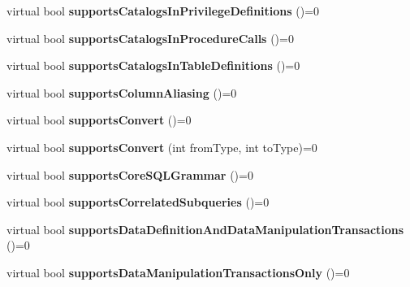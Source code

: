 \begin{DoxyCompactItemize}
virtual bool {\bfseries supports\+Catalogs\+In\+Privilege\+Definitions} ()=0
\item 
\hypertarget{classsql_1_1_database_meta_data_a2ea724300ba9c7ef54de175e6acb0f87}{}\label{classsql_1_1_database_meta_data_a2ea724300ba9c7ef54de175e6acb0f87} 
virtual bool {\bfseries supports\+Catalogs\+In\+Procedure\+Calls} ()=0
\item 
\hypertarget{classsql_1_1_database_meta_data_acf0b9704c41f31cb568e821ffa61cb0b}{}\label{classsql_1_1_database_meta_data_acf0b9704c41f31cb568e821ffa61cb0b} 
virtual bool {\bfseries supports\+Catalogs\+In\+Table\+Definitions} ()=0
\item 
\hypertarget{classsql_1_1_database_meta_data_acc7cc7e78d82c0628ca54bf3bff0c7bb}{}\label{classsql_1_1_database_meta_data_acc7cc7e78d82c0628ca54bf3bff0c7bb} 
virtual bool {\bfseries supports\+Column\+Aliasing} ()=0
\item 
\hypertarget{classsql_1_1_database_meta_data_a5f9303aad8e0ccf7270f912a6b336360}{}\label{classsql_1_1_database_meta_data_a5f9303aad8e0ccf7270f912a6b336360} 
virtual bool {\bfseries supports\+Convert} ()=0
\item 
\hypertarget{classsql_1_1_database_meta_data_a85bc3e81d60d333a4ab22365033d7153}{}\label{classsql_1_1_database_meta_data_a85bc3e81d60d333a4ab22365033d7153} 
virtual bool {\bfseries supports\+Convert} (int from\+Type, int to\+Type)=0
\item 
\hypertarget{classsql_1_1_database_meta_data_ad0c6c7c01fc06ecb5647e14e2eaa84f0}{}\label{classsql_1_1_database_meta_data_ad0c6c7c01fc06ecb5647e14e2eaa84f0} 
virtual bool {\bfseries supports\+Core\+S\+Q\+L\+Grammar} ()=0
\item 
\hypertarget{classsql_1_1_database_meta_data_a17e0cd15f34f7bbda13db4d784578a7f}{}\label{classsql_1_1_database_meta_data_a17e0cd15f34f7bbda13db4d784578a7f} 
virtual bool {\bfseries supports\+Correlated\+Subqueries} ()=0
\item 
\hypertarget{classsql_1_1_database_meta_data_a75cfacc7f6d6c616c6c546e5ee73c1d1}{}\label{classsql_1_1_database_meta_data_a75cfacc7f6d6c616c6c546e5ee73c1d1} 
virtual bool {\bfseries supports\+Data\+Definition\+And\+Data\+Manipulation\+Transactions} ()=0
\item 
\hypertarget{classsql_1_1_database_meta_data_aaddb568051ab1ebae1c20f4eebb0cc0b}{}\label{classsql_1_1_database_meta_data_aaddb568051ab1ebae1c20f4eebb0cc0b} 
virtual bool {\bfseries supports\+Data\+Manipulation\+Transactions\+Only} ()=0
\item 
\hypertarget{classsql_1_1_database_meta_data_a8508ed908bd70fc61338faca963bc5ba}{}\label{classsql_1_1_database_meta_data_a8508ed908bd70fc61338faca963bc5ba} 

\end{DoxyCompactItemize}
